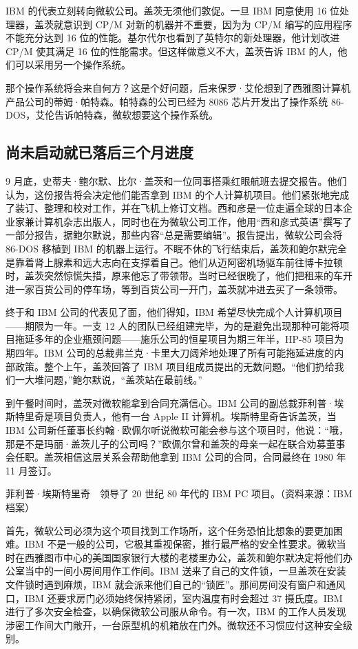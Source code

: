 \documentclass[12pt,UTF8]{ctexbook}
\begin{document}
IBM 的代表立刻转向微软公司。盖茨无须他们敦促。一旦 IBM 同意使用 16 位处理器，盖茨就意识到 CP/M 对新的机器并不重要，因为为 CP/M 编写的应用程序不能充分达到 16 位的性能。基尔代尔也看到了英特尔的新处理器，他计划改进 CP/M 使其满足 16 位的性能需求。但这样做意义不大，盖茨告诉 IBM 的人，他们可以采用另一个操作系统。

那个操作系统将会来自何方？这是个好问题，后来保罗·艾伦想到了西雅图计算机产品公司的蒂姆·帕特森。帕特森的公司已经为 8086 芯片开发出了操作系统 86-DOS，艾伦告诉帕特森，微软想要这个操作系统。





\subsection{尚未启动就已落后三个月进度}


9 月底，史蒂夫·鲍尔默、比尔·盖茨和一位同事搭乘红眼航班去提交报告。他们认为，这份报告将会决定他们能否拿到 IBM 的个人计算机项目。他们紧张地完成了装订、整理和校对工作，并在飞机上修订文档。西和彦是一位走遍全球的日本企业家兼计算机杂志出版人，同时也在为微软公司工作，他用“西和彦式英语”撰写了一部分报告，据鲍尔默说，那些内容“总是需要编辑”。报告提出，微软公司会将 86-DOS 移植到 IBM 的机器上运行。不眠不休的飞行结束后，盖茨和鲍尔默完全是靠着肾上腺素和远大志向在支撑着自己。他们从迈阿密机场驱车前往博卡拉顿时，盖茨突然惊慌失措，原来他忘了带领带。当时已经很晚了，他们把租来的车开进一家百货公司的停车场，等到百货公司一开门，盖茨就冲进去买了一条领带。

终于和 IBM 公司的代表见了面，他们得知，IBM 希望尽快完成个人计算机项目——期限为一年。一支 12 人的团队已经组建完毕，为的是避免出现那种可能将项目拖延多年的企业瓶颈问题——施乐公司的恒星项目为期三年半，HP-85 项目为期四年。IBM 公司的总裁弗兰克·卡里大刀阔斧地处理了所有可能拖延进度的内部政策。整个上午，盖茨回答了 IBM 项目组成员提出的无数问题。“他们扔给我们一大堆问题，”鲍尔默说，“盖茨站在最前线。”

到午餐时间时，盖茨对微软能拿到合同充满信心。IBM 公司的副总裁菲利普·埃斯特里奇是项目负责人，他有一台 Apple II 计算机。埃斯特里奇告诉盖茨，当 IBM 公司新任董事长约翰·欧佩尔听说微软可能会参与这个项目时，他说：“哦，那是不是玛丽·盖茨儿子的公司吗？”欧佩尔曾和盖茨的母亲一起在联合劝募董事会任职。盖茨相信这层关系会帮助他拿到 IBM 公司的合同，合同最终在 1980 年 11 月签订。



菲利普·埃斯特里奇　领导了 20 世纪 80 年代的 IBM PC 项目。（资料来源：IBM 档案）

首先，微软公司必须为这个项目找到工作场所，这个任务恐怕比想象的要更加困难。IBM 不是一般的公司，它极其重视保密，推行最严格的安全性要求。微软当时在西雅图市中心的美国国家银行大楼的老楼里办公，盖茨和鲍尔默决定将他们办公室当中的一间小房间用作工作间。IBM 送来了自己的文件锁，一旦盖茨在安装文件锁时遇到麻烦，IBM 就会派来他们自己的“锁匠”。那间房间没有窗户和通风口，IBM 还要求房门必须始终保持紧闭，室内温度有时会超过 37 摄氏度。IBM 进行了多次安全检查，以确保微软公司服从命令。有一次，IBM 的工作人员发现涉密工作间大门敞开，一台原型机的机箱放在门外。微软还不习惯应付这种安全级别。
\end{document}
